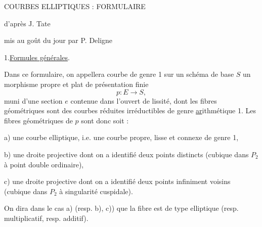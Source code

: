 
\begin{center}
COURBES ELLIPTIQUES : FORMULAIRE

 d'après J. Tate

mis au goût du jour par P. Deligne
\end{center}

1.\quad \uline{Formules générales}.

Dans ce formulaire, on appellera courbe de genre 1 sur un schéma de base $S$ un morphisme propre et plat de présentation finie
\[
p:E\longrightarrow S,
\]
muni d'une section $e$ contenue dans l'ouvert de lissité, dont les fibres géométriques sont des courbes réduites irréductibles de genre \uline{ar}ithmétique 1. Les fibres géométriques de $p$ sont donc soit :

 a) une courbe elliptique, i.e. une courbe propre, lisse et connexe de genre 1,

 b) une droite projective dont on a identifié deux points distincts (cubique dans $P_2$ à point double ordinaire),

 c) une droite projective dont on a identifié deux points infiniment voisins (cubique dans $P_2$ à singularité cuspidale).

On dira dans le cas a) (resp. b), c)) que la fibre est de type elliptique (resp. multiplicatif, resp. additif).

